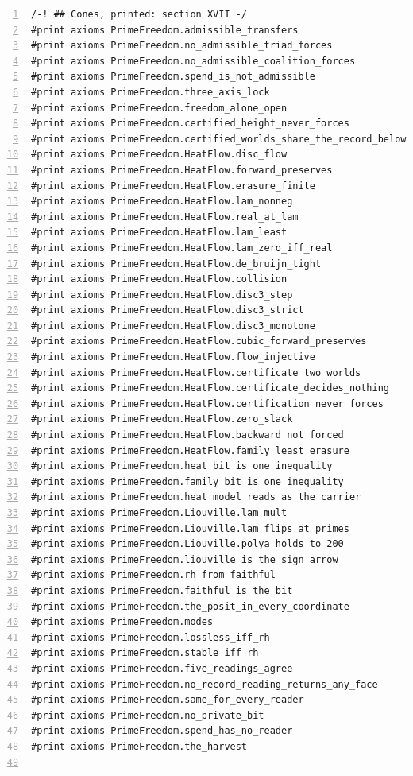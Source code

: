 \documentclass[10pt]{article}
\newcommand{\leansize}{\fontsize{5.5pt}{6.75pt}\selectfont}
\begin{document}
\begin{multicols}{2}
\begin{Verbatim}[numbers=left,firstnumber=1,numbersep=3pt,xleftmargin=2.6em,breaklines=true,breakanywhere=true,breakautoindent=false,breakindent=1.4em,breaksymbolleft={},breakanywheresymbolpre={},fontsize=\leansize]
/-! ## Cones, printed: section XVII -/
#print axioms PrimeFreedom.admissible_transfers
#print axioms PrimeFreedom.no_admissible_triad_forces
#print axioms PrimeFreedom.no_admissible_coalition_forces
#print axioms PrimeFreedom.spend_is_not_admissible
#print axioms PrimeFreedom.three_axis_lock
#print axioms PrimeFreedom.freedom_alone_open
#print axioms PrimeFreedom.certified_height_never_forces
#print axioms PrimeFreedom.certified_worlds_share_the_record_below
#print axioms PrimeFreedom.HeatFlow.disc_flow
#print axioms PrimeFreedom.HeatFlow.forward_preserves
#print axioms PrimeFreedom.HeatFlow.erasure_finite
#print axioms PrimeFreedom.HeatFlow.lam_nonneg
#print axioms PrimeFreedom.HeatFlow.real_at_lam
#print axioms PrimeFreedom.HeatFlow.lam_least
#print axioms PrimeFreedom.HeatFlow.lam_zero_iff_real
#print axioms PrimeFreedom.HeatFlow.de_bruijn_tight
#print axioms PrimeFreedom.HeatFlow.collision
#print axioms PrimeFreedom.HeatFlow.disc3_step
#print axioms PrimeFreedom.HeatFlow.disc3_strict
#print axioms PrimeFreedom.HeatFlow.disc3_monotone
#print axioms PrimeFreedom.HeatFlow.cubic_forward_preserves
#print axioms PrimeFreedom.HeatFlow.flow_injective
#print axioms PrimeFreedom.HeatFlow.certificate_two_worlds
#print axioms PrimeFreedom.HeatFlow.certificate_decides_nothing
#print axioms PrimeFreedom.HeatFlow.certification_never_forces
#print axioms PrimeFreedom.HeatFlow.zero_slack
#print axioms PrimeFreedom.HeatFlow.backward_not_forced
#print axioms PrimeFreedom.HeatFlow.family_least_erasure
#print axioms PrimeFreedom.heat_bit_is_one_inequality
#print axioms PrimeFreedom.family_bit_is_one_inequality
#print axioms PrimeFreedom.heat_model_reads_as_the_carrier
#print axioms PrimeFreedom.Liouville.lam_mult
#print axioms PrimeFreedom.Liouville.lam_flips_at_primes
#print axioms PrimeFreedom.Liouville.polya_holds_to_200
#print axioms PrimeFreedom.liouville_is_the_sign_arrow
#print axioms PrimeFreedom.rh_from_faithful
#print axioms PrimeFreedom.faithful_is_the_bit
#print axioms PrimeFreedom.the_posit_in_every_coordinate
#print axioms PrimeFreedom.modes
#print axioms PrimeFreedom.lossless_iff_rh
#print axioms PrimeFreedom.stable_iff_rh
#print axioms PrimeFreedom.five_readings_agree
#print axioms PrimeFreedom.no_record_reading_returns_any_face
#print axioms PrimeFreedom.same_for_every_reader
#print axioms PrimeFreedom.no_private_bit
#print axioms PrimeFreedom.spend_has_no_reader
#print axioms PrimeFreedom.the_harvest


\end{Verbatim}
\end{multicols}
\end{document}

